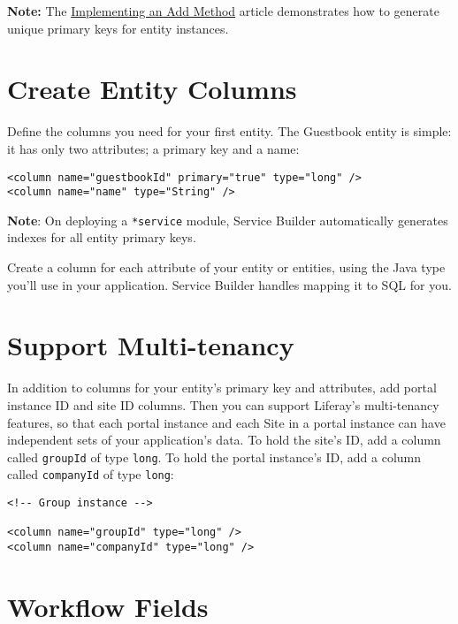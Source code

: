 \noindent\hrulefill

\textbf{Note:} The
\href{/docs/7-2/appdev/-/knowledge_base/a/implementing-an-add-method\#step-3-generate-a-primary-key}{Implementing
an Add Method} article demonstrates how to generate unique primary keys
for entity instances.

\noindent\hrulefill

\section{Create Entity Columns}\label{create-entity-columns}

Define the columns you need for your first entity. The Guestbook entity
is simple: it has only two attributes; a primary key and a name:

\begin{verbatim}
<column name="guestbookId" primary="true" type="long" />
<column name="name" type="String" />
\end{verbatim}

\textbf{Note}: On deploying a \texttt{*service} module, Service Builder
automatically generates indexes for all entity primary keys.

Create a column for each attribute of your entity or entities, using the
Java type you'll use in your application. Service Builder handles
mapping it to SQL for you.

\section{Support Multi-tenancy}\label{support-multi-tenancy}

In addition to columns for your entity's primary key and attributes, add
portal instance ID and site ID columns. Then you can support Liferay's
multi-tenancy features, so that each portal instance and each Site in a
portal instance can have independent sets of your application's data. To
hold the site's ID, add a column called \texttt{groupId} of type
\texttt{long}. To hold the portal instance's ID, add a column called
\texttt{companyId} of type \texttt{long}:

\begin{verbatim}
<!-- Group instance -->

<column name="groupId" type="long" />
<column name="companyId" type="long" />
\end{verbatim}

\section{Workflow Fields}\label{workflow-fields}


